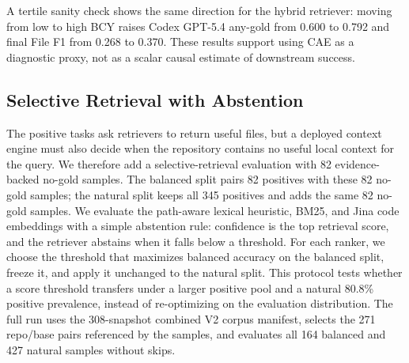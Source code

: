 \documentclass[11pt]{article}
\begin{document}
A tertile sanity check shows the same direction for the hybrid retriever: moving from low to high BCY raises Codex GPT-5.4 any-gold from 0.600 to 0.792 and final File F1 from 0.268 to 0.370. These results support using CAE as a diagnostic proxy, not as a scalar causal estimate of downstream success.

\subsection{Selective Retrieval with Abstention}

The positive tasks ask retrievers to return useful files, but a deployed context engine must also decide when the repository contains no useful local context for the query. We therefore add a selective-retrieval evaluation with 82 evidence-backed no-gold samples. The balanced split pairs 82 positives with these 82 no-gold samples; the natural split keeps all 345 positives and adds the same 82 no-gold samples. We evaluate the path-aware lexical heuristic, BM25, and Jina code embeddings with a simple abstention rule: confidence is the top retrieval score, and the retriever abstains when it falls below a threshold. For each ranker, we choose the threshold that maximizes balanced accuracy on the balanced split, freeze it, and apply it unchanged to the natural split. This protocol tests whether a score threshold transfers under a larger positive pool and a natural 80.8\% positive prevalence, instead of re-optimizing on the evaluation distribution. The full run uses the 308-snapshot combined V2 corpus manifest, selects the 271 repo/base pairs referenced by the samples, and evaluates all 164 balanced and 427 natural samples without skips.
\end{document}
